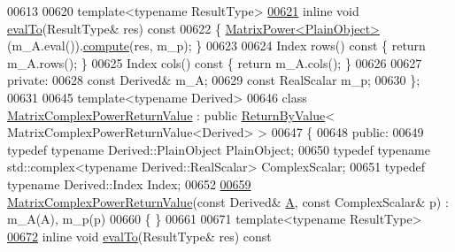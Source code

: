 \begin{DoxyCode}
00613 
00620     \textcolor{keyword}{template}<\textcolor{keyword}{typename} ResultType>
\hyperlink{class_eigen_1_1_matrix_power_return_value_acdef58da9a4bcd2ec70260e73ce31973}{00621}     \textcolor{keyword}{inline} \textcolor{keywordtype}{void} \hyperlink{class_eigen_1_1_matrix_power_return_value_acdef58da9a4bcd2ec70260e73ce31973}{evalTo}(ResultType& res)\textcolor{keyword}{ const}
00622 \textcolor{keyword}{    }\{ \hyperlink{class_eigen_1_1_matrix_power}{MatrixPower<PlainObject>}(m\_A.eval()).\hyperlink{class_eigen_1_1_matrix_power_atomic_ac3cdfb54a5b60079d068784534cbc174}{compute}(res, m\_p); \}
00623 
00624     Index rows()\textcolor{keyword}{ const }\{ \textcolor{keywordflow}{return} m\_A.rows(); \}
00625     Index cols()\textcolor{keyword}{ const }\{ \textcolor{keywordflow}{return} m\_A.cols(); \}
00626 
00627   \textcolor{keyword}{private}:
00628     \textcolor{keyword}{const} Derived& m\_A;
00629     \textcolor{keyword}{const} RealScalar m\_p;
00630 \};
00631 
00645 \textcolor{keyword}{template}<\textcolor{keyword}{typename} Derived>
00646 \textcolor{keyword}{class }\hyperlink{class_eigen_1_1_matrix_complex_power_return_value}{MatrixComplexPowerReturnValue} : \textcolor{keyword}{public} 
      \hyperlink{group___core___module_class_eigen_1_1_return_by_value}{ReturnByValue}< MatrixComplexPowerReturnValue<Derived> >
00647 \{
00648   \textcolor{keyword}{public}:
00649     \textcolor{keyword}{typedef} \textcolor{keyword}{typename} Derived::PlainObject PlainObject;
00650     \textcolor{keyword}{typedef} \textcolor{keyword}{typename} std::complex<typename Derived::RealScalar> ComplexScalar;
00651     \textcolor{keyword}{typedef} \textcolor{keyword}{typename} Derived::Index Index;
00652 
\hyperlink{class_eigen_1_1_matrix_complex_power_return_value_a3e5903e22f70e9deb07c3967ae52fd54}{00659}     \hyperlink{class_eigen_1_1_matrix_complex_power_return_value_a3e5903e22f70e9deb07c3967ae52fd54}{MatrixComplexPowerReturnValue}(\textcolor{keyword}{const} Derived& \hyperlink{group___core___module_class_eigen_1_1_matrix}{A}, \textcolor{keyword}{const} ComplexScalar& p) :
       m\_A(A), m\_p(p)
00660     \{ \}
00661 
00671     \textcolor{keyword}{template}<\textcolor{keyword}{typename} ResultType>
\hyperlink{class_eigen_1_1_matrix_complex_power_return_value_aac9c4065d4711e62af085633a38c4416}{00672}     \textcolor{keyword}{inline} \textcolor{keywordtype}{void} \hyperlink{class_eigen_1_1_matrix_complex_power_return_value_aac9c4065d4711e62af085633a38c4416}{evalTo}(ResultType& res)\textcolor{keyword}{ const}

\end{DoxyCode}
